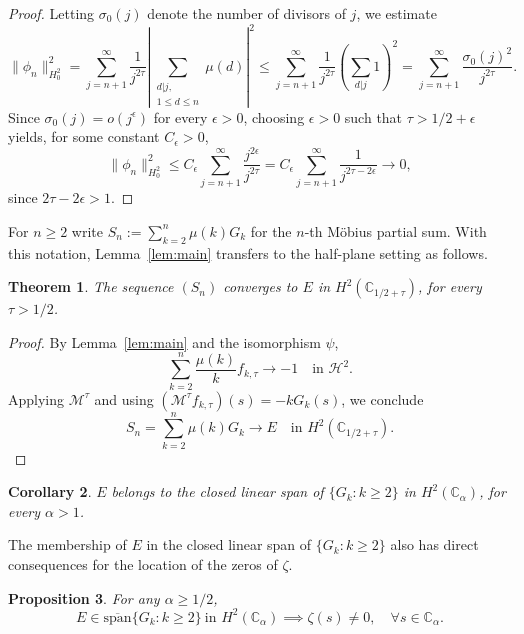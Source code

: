 \documentclass[11pt]{extarticle}
\numberwithin{equation}{section}
\theoremstyle{plain}
\newtheorem{theorem}{Theorem}[section]
\newtheorem{corollary}[theorem]{Corollary}
\newtheorem{proposition}[theorem]{Proposition}
\theoremstyle{remark}
\begin{document}
\begin{proof}
Letting $\sigma_0(j)$ denote the number of divisors of $j$, we estimate
\[
\|\phi_n\|^2_{H^2_0} = \sum_{j=n+1}^{\infty} \frac{1}{j^{2\tau}}\left|\sum_{\substack{d|j,\\ 1\leq d\leq n}}\mu(d)\right|^2 
\leq \sum_{j=n+1}^{\infty} \frac{1}{j^{2\tau}}\left(\sum_{d|j}1\right)^2
= \sum_{j=n+1}^{\infty} \frac{\sigma_0(j)^2}{j^{2\tau}}.
\]
Since $\sigma_0(j) = o(j^\epsilon)$ for every $\epsilon > 0$, choosing $\epsilon > 0$
such that $\tau > 1/2 + \epsilon$ yields, for some constant $C_\epsilon > 0$,
\[
\|\phi_n\|^2_{H^2_0} \leq C_\epsilon \sum_{j=n+1}^{\infty} \frac{j^{2\epsilon}}{j^{2\tau}} 
= C_\epsilon \sum_{j=n+1}^{\infty} \frac{1}{j^{2\tau - 2\epsilon}} \longrightarrow 0,
\]
since $2\tau - 2\epsilon > 1$.
\end{proof}

For $n \geq 2$ write $S_n := \sum_{k=2}^{n} \mu(k) G_k$ for the $n$-th M\"obius partial sum. With this notation, Lemma~\ref{lem:main}
transfers to the half-plane setting as follows.

\begin{theorem}\label{main-teo}
The sequence $(S_n)$ converges to $E$ in $H^2(\mathbb{C}_{1/2+\tau})$, for
every $\tau > 1/2$.
\end{theorem}

\begin{proof}
By Lemma~\ref{lem:main} and the isomorphism $\psi$,
\[
\sum_{k=2}^{n} \frac{\mu(k)}{k} f_{k,\tau} \longrightarrow -1 \quad \text{in } \mathcal{H}^2.
\]
Applying $\mathcal{M}^\tau$ and using $(\mathcal{M}^\tau f_{k,\tau})(s) = -kG_k(s)$, we conclude
\begin{equation}\label{eq:main-conv}
S_n = \sum_{k=2}^{n} \mu(k) G_k \longrightarrow E \quad \text{in } H^2(\mathbb{C}_{1/2+\tau}).
\end{equation}
\end{proof}

\begin{corollary}\label{cor:main}
$E$ belongs to the closed linear span of $\{G_k : k \geq 2\}$ in 
$H^2(\mathbb{C}_\alpha)$, for every $\alpha > 1$.
\end{corollary}

The membership of $E$ in the closed linear span of $\{G_k : k \geq 2\}$ also has
direct consequences for the location of the zeros of $\zeta$.

\begin{proposition}\label{main-prop}
For any $\alpha \geq 1/2$,
\[
E \in \overline{\mathrm{span}}\{G_k : k \geq 2\} \ \text{in } H^2(\mathbb{C}_\alpha) 
\implies \zeta(s) \neq 0, \quad \forall s \in \mathbb{C}_\alpha.
\]
\end{proposition}
\end{document}
